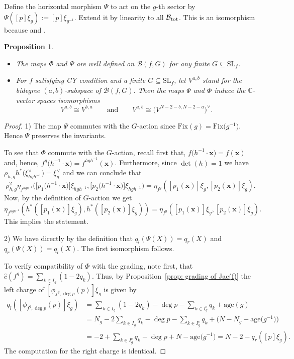 \documentclass[10pt,a4paper]{amsart}
\numberwithin{equation}{section}
\newtheorem{Proposition}[Theorem]{Proposition}
 { \theoremstyle{definition}
\newtheorem{Definition}[Theorem]{Definition}
\newtheorem{Note}[Theorem]{Note}
\newtheorem{Example}[Theorem]{Example}
\newtheorem{Remark}[Theorem]{Remark} }
\newcommand{\CC}{{\mathbb{C}}}
\newcommand{\SL}{{\mathrm{SL}}}
\newcommand{\Jac}{\mathrm{Jac}}
\newcommand{\Fix}{\mathrm{Fix}}
\newcommand{\age}{\mathrm{age}}
\def\B{{\mathcal B}}
\begin{document}
Define the horizontal morphism $\Psi$ to act on the $g$-th sector by $\Psi([p] \xi_g) := [p] \xi_{g^{-1}}$.
Extend it by linearity to all $\B_{\rm tot}$.
This is an isomorphism because  and \smash{$\Jac(f^g) = \Jac\bigl(f^{g^{-1}}\bigr)$}.
\begin{Proposition}\label{proposition: Serre and Hodge under CY}\quad
\begin{itemize}\itemsep=0pt
\item[$(1)$] The maps $\Phi$ and $\Psi$ are well defined on $\B(f,G)$ for any finite $G \subseteq \SL_f$.
\item[$(2)$]	For $f$ satisfying CY condition and a finite $G \subseteq \SL_f$, let $V^{a,b}$ stand for the bidegree $(a,b)$-subspace of $\B(f,G)$.
	Then the maps $\Psi$ and $\Phi$ induce the $\CC$-vector spaces isomorphisms
	\[
		V^{a,b} \cong V^{b,a} \qquad \text{and} \qquad V^{a,b} \cong \bigl(V^{N-2-b,N-2-a}\bigr)^\vee.
	\]
\end{itemize}
\end{Proposition}
\begin{proof}
1) The map $\Psi$ commutes with the $G$-action since $\Fix(g)=\Fix\bigl(g^{-1}\bigr)$. Hence $\Psi$ preserves the invariants.

To see that $\Phi$ commute with the $G$-action, recall first that, $f\bigl(h^{-1}\cdot \mathbf{x}\bigr)=f(\mathbf{x})$ and, hence, $f^g\bigl(h^{-1}\cdot \mathbf{x}\bigr)=f^{hgh^{-1}}(\mathbf{x})$.
Furthermore, since $\det(h)=1$ we have $\rho_{h,g}h^*\bigl(\xi_{hgh^{-1}}^\vee\bigr)= \xi^\vee_g$ and we can conclude that
\[
\rho_{h,g}^{2}\eta_{f^{hgh^{-1}}}\bigl(\bigl[p_1\bigl(h^{-1}\cdot\mathbf{x}\bigr)\bigr]\xi_{hgh^{-1}},
\bigl[p_2\bigl(h^{-1}\cdot\mathbf{x}\bigr)\bigr]\xi_{hgh^{-1}}\bigr)=
\eta_{f^{g}}([p_1(\mathbf{x})]\xi_{g},[p_2(\mathbf{x})]\xi_{g}).
\]
Now, by the definition of $G$-action we get
\[
\eta_{f^{hgh^{-1}}}(h^*([p_1(\mathbf{x})]\xi_{g}),h^*([p_2(\mathbf{x})]\xi_{g}))=
\eta_{f^{g}}([p_1(\mathbf{x})]\xi_{g},[p_2(\mathbf{x})]\xi_{g}).
\]
This implies the statement.

2) We have directly by the definition that $q_l(\Psi(X)) = q_r(X)$ and $q_r(\Psi(X)) = q_l(X)$. The first isomorphism follows.

To verify compatibility of $\Phi$ with the grading, note first, that $\widehat{c}(f^g)=\sum_{k\in I_g}(1-2q_k)$. Thus, by Proposition~\ref{prop: grading of Jac(f)} the left charge of $[\phi_{f^g,\deg p}(p)]\xi_g$ is given by
\begin{align*}q_l([\phi_{f^g,\deg p}(p)]\xi_g) &= \sum_{k\in I_g}(1-2q_k)-\deg p- \sum_{k \in I_g^c} q_{k} + \age{(g)}
\\ &=N_g-2\sum_{k\in I_g} q_k-\deg p- \sum_{k \in I_g^c} q_{k}+\bigl(N-N_g-\age{\bigl(g^{-1}\bigr)}\bigr)
\\ &=-2+\sum_{k\in I^c_g} q_k-\deg p +N-\age{\bigl(g^{-1}\bigr)}=N-2-q_r([p]\xi_g).
\end{align*}
The computation for the right charge is identical.
\end{proof}
\end{document}
